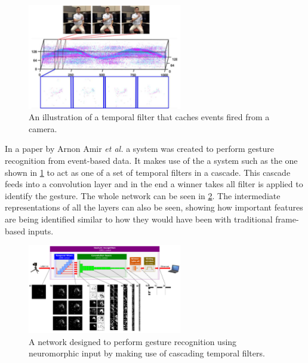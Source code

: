 \begin{figure}[htb]
      \centering
      \includegraphics[width=0.6\textwidth]{background/images/temporal_filter.png}
      \caption{An illustration of a temporal filter that caches events fired from a camera\cite{eventBasedGestureRec}.}
      \label{fig:temporal_filter}
\end{figure}

In a paper by Arnon Amir \textit{et al.}\cite{eventBasedGestureRec} a system was created to perform gesture recognition from event-based data. It makes use of the a system such as the one shown in \cref{fig:temporal_filter} to act as one of a set of temporal filters in a cascade. This cascade feeds into a convolution layer and in the end a winner takes all filter is applied to identify the gesture. The whole network can be seen in \cref{fig:event_to_gesture_rec_network}. The intermediate representations of all the layers can also be seen, showing how important features are being identified similar to how they would have been with traditional frame-based inputs.

\begin{figure}[htb]
      \centering
      \includegraphics[width=0.6\textwidth]{background/images/event_to_gesture_rec_network.png}
      \caption{A network designed to perform gesture recognition using neuromorphic input by making use of cascading temporal filters\cite{eventBasedGestureRec}.}
      \label{fig:event_to_gesture_rec_network}
\end{figure}

